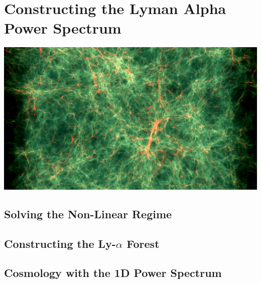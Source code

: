 \documentclass[11pt, twoside, a4paper, openright]{report}
\begin{document}
\chapter{Constructing the Lyman Alpha Power Spectrum}
{\color{purple}\titlerule[2.5pt]}
\vspace{4pc}%
\label{chap:Simulations}
{\centering
\includegraphics[width=\textwidth]{Visu/HDM_500eV_z22.png}}
\clearpage

	

	\section{Solving the Non-Linear Regime}
	\label{sec:gadget}
	

	\section{Constructing the Ly-$\alpha$ Forest}
	\label{sec:extract}
	

	\section{Cosmology with the 1D Power Spectrum}
	\label{sec:nuis}
	

\setcounter{chapter}{5}
\end{document}
